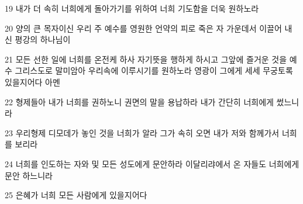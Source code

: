 \par 19 내가 더 속히 너희에게 돌아가기를 위하여 너희 기도함을 더욱 원하노라
\par 20 양의 큰 목자이신 우리 주 예수를 영원한 언약의 피로 죽은 자 가운데서 이끌어 내신 평강의 하나님이
\par 21 모든 선한 일에 너희를 온전케 하사 자기뜻을 행하게 하시고 그앞에 즐거운 것을 예수 그리스도로 말미암아 우리속에 이루시기를 원하노라 영광이 그에게 세세 무궁토록 있을지어다 아멘
\par 22 형제들아 내가 너희를 권하노니 권면의 말을 용납하라 내가 간단히 너희에게 썼느니라
\par 23 우리형제 디모데가 놓인 것을 너희가 알라 그가 속히 오면 내가 저와 함께가서 너희를 보리라
\par 24 너희를 인도하는 자와 및 모든 성도에게 문안하라 이달리랴에서 온 자들도 너희에게 문안 하느니라
\par 25 은혜가 너희 모든 사람에게 있을지어다



